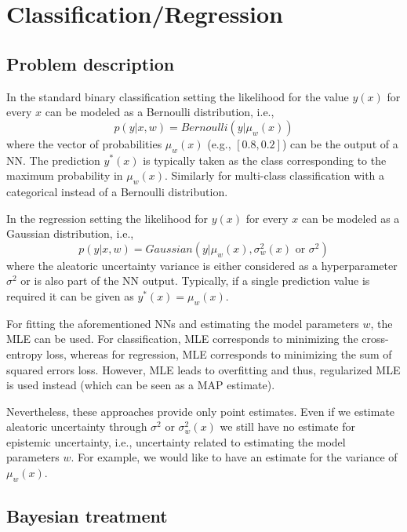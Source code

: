 \section{Classification/Regression}
\subsection{Problem description}

In the standard binary classification setting the likelihood for the value $y(x)$ for every $x$ can be modeled as a Bernoulli distribution, i.e., 
\begin{equation}\label{eq:class:likelihood}
	p(y|x, w) = Bernoulli(y|\mu_w(x))
\end{equation}
where the vector of probabilities $\mu_w(x)$ (e.g., $[0.8, 0.2]$) can be the output of a NN.
The prediction $y^*(x)$ is typically taken as the class corresponding to the maximum probability in $\mu_w(x)$.
Similarly for multi-class classification with a categorical instead of a Bernoulli distribution.

In the regression setting the likelihood for $y(x)$ for every $x$ can be modeled as a Gaussian distribution, i.e., 
\begin{equation}\label{eq:regression:likelihood}
	p(y|x, w) = Gaussian(y|\mu_w(x), \sigma^2_w(x) \text{ or }  \sigma^2)
\end{equation}
where the aleatoric uncertainty variance is either considered as a hyperparameter $\sigma^2$ or is also part of the NN output.
Typically, if a single prediction value is required it can be given as $y^*(x) = \mu_w(x)$.

For fitting the aforementioned NNs and estimating the model parameters $w$, the MLE can be used. 
For classification, MLE corresponds to minimizing the cross-entropy loss, whereas for regression, MLE corresponds to minimizing the sum of squared errors loss.
However, MLE leads to overfitting and thus, regularized MLE is used instead (which can be seen as a MAP estimate). 

Nevertheless, these approaches provide only point estimates. 
Even if we estimate aleatoric uncertainty through $\sigma^2$ or $\sigma_w^2(x)$ we still have no estimate for epistemic uncertainty, i.e., uncertainty related to estimating the model parameters $w$.
For example, we would like to have an estimate for the variance of $\mu_w(x)$.

\subsection{Bayesian treatment}

